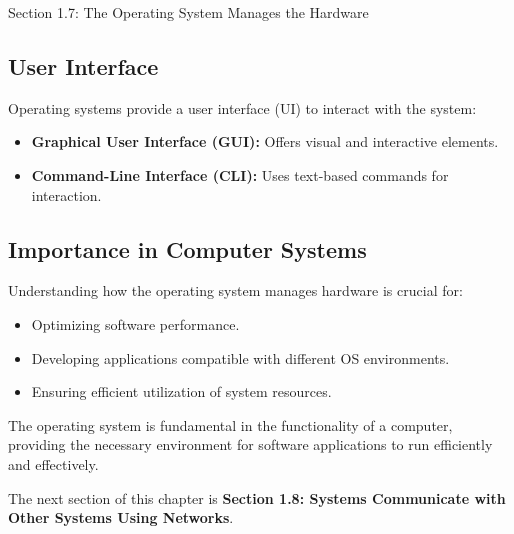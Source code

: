 \begin{notes}{Section 1.7: The Operating System Manages the Hardware}
    \subsection*{User Interface}

    Operating systems provide a user interface (UI) to interact with the system:
    
    \begin{itemize}
        \item \textbf{Graphical User Interface (GUI):} Offers visual and interactive elements.
        \item \textbf{Command-Line Interface (CLI):} Uses text-based commands for interaction.
    \end{itemize}
    
    \subsection*{Importance in Computer Systems}

    Understanding how the operating system manages hardware is crucial for:

    \begin{itemize}
        \item Optimizing software performance.
        \item Developing applications compatible with different OS environments.
        \item Ensuring efficient utilization of system resources.
    \end{itemize}
    
    The operating system is fundamental in the functionality of a computer, providing the necessary environment for software applications to run efficiently and effectively.    
\end{notes}

The next section of this chapter is \textbf{Section 1.8: Systems Communicate with Other Systems Using Networks}.

